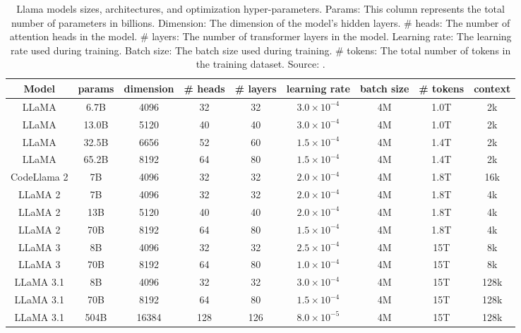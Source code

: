 \begin{table}[ht]
	\centering
	\begin{tabular}{@{}ccccccccc@{}}
		\toprule
		Model       & params & dimension & \# heads & \# layers & learning rate          & batch size & \# tokens & context \\
		\midrule
		LLaMA       & 6.7B   & 4096      & 32       & 32        & \(3.0 \times 10^{-4}\) & 4M         & 1.0T      & 2k      \\
		LLaMA       & 13.0B  & 5120      & 40       & 40        & \(3.0 \times 10^{-4}\) & 4M         & 1.0T      & 2k      \\
		LLaMA       & 32.5B  & 6656      & 52       & 60        & \(1.5 \times 10^{-4}\) & 4M         & 1.4T      & 2k      \\
		LLaMA       & 65.2B  & 8192      & 64       & 80        & \(1.5 \times 10^{-4}\) & 4M         & 1.4T      & 2k      \\
		CodeLlama 2 & 7B     & 4096      & 32       & 32        & $2.0 \times 10^{-4}$   & 4M         & 1.8T      & 16k     \\
		LLaMA 2     & 7B     & 4096      & 32       & 32        & $2.0 \times 10^{-4}$   & 4M         & 1.8T      & 4k      \\
		LLaMA 2     & 13B    & 5120      & 40       & 40        & $2.0 \times 10^{-4}$   & 4M         & 1.8T      & 4k      \\
		LLaMA 2     & 70B    & 8192      & 64       & 80        & $1.5 \times 10^{-4}$   & 4M         & 1.8T      & 4k      \\
		LLaMA 3     & 8B     & 4096      & 32       & 32        & $2.5 \times 10^{-4}$   & 4M         & 15T       & 8k      \\
		LLaMA 3     & 70B    & 8192      & 64       & 80        & $1.0 \times 10^{-4}$   & 4M         & 15T       & 8k      \\
		LLaMA 3.1   & 8B     & 4096      & 32       & 32        & $3.0 \times 10^{-4}$   & 4M         & 15T       & 128k    \\
		LLaMA 3.1   & 70B    & 8192      & 64       & 80        & $1.5 \times 10^{-4}$   & 4M         & 15T       & 128k    \\
		LLaMA 3.1   & 504B   & 16384     & 128      & 126       & $8.0 \times 10^{-5}$   & 4M         & 15T       & 128k    \\
		\bottomrule
	\end{tabular}
	\caption{Llama models sizes, architectures, and optimization hyper-parameters.
		Params: This column represents the total number of parameters in billions.
		Dimension: The dimension of the model's hidden layers.
		\# heads: The number of attention heads in the model.
		\# layers: The number of transformer layers in the model.
		Learning rate: The learning rate used during training.
		Batch size: The batch size used during training.
		\# tokens: The total number of tokens in the training dataset.
		Source: \textcite{touvron2023llama}.}
	\label{tab:llama-model-params}
\end{table}

